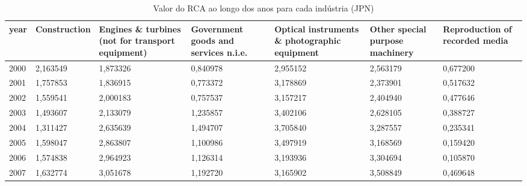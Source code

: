 \begin{table}
\centering
\caption{Valor do RCA ao longo dos anos para cada indústria (JPN)}
\begin{tabular}{p{1cm}p{2cm}p{2cm}p{2cm}p{2cm}p{2cm}p{2cm}}
\toprule
 year &  Construction &  Engines \& turbines (not for transport equipment) &  Government goods and services n.i.e. &  Optical instruments \& photographic equipment &  Other special purpose machinery &  Reproduction of recorded media \\
\midrule
 2000 &      2,163549 &                                          1,873326 &                              0,840978 &                                      2,955152 &                         2,563179 &                        0,677200 \\
 2001 &      1,757853 &                                          1,836915 &                              0,773372 &                                      3,178869 &                         2,373901 &                        0,517632 \\
 2002 &      1,559541 &                                          2,000183 &                              0,757537 &                                      3,157217 &                         2,404940 &                        0,477646 \\
 2003 &      1,493607 &                                          2,133079 &                              1,235857 &                                      3,402106 &                         2,628105 &                        0,388727 \\
 2004 &      1,311427 &                                          2,635639 &                              1,494707 &                                      3,705840 &                         3,287557 &                        0,235341 \\
 2005 &      1,598047 &                                          2,863807 &                              1,100986 &                                      3,497919 &                         3,168569 &                        0,159420 \\
 2006 &      1,574838 &                                          2,964923 &                              1,126314 &                                      3,193936 &                         3,304694 &                        0,105870 \\
 2007 &      1,632774 &                                          3,051678 &                              1,192720 &                                      3,165902 &                         3,508849 &                        0,469648 \\

\end{tabular}
\end{table}
